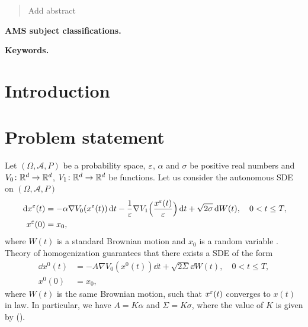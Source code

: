 \documentclass[10pt]{article}
\begin{document}
\maketitle	

\begin{abstract} Add abstract
\end{abstract}

\textbf{AMS subject classifications.} 

\textbf{Keywords.} 

\normalsize
\section{Introduction}


\section{Problem statement}

Let $(\Omega, \mathcal A, P)$ be a probability space, $\varepsilon$, $\alpha$ and $\sigma$ be positive real numbers and $V_0 \colon \mathbb{R}^d \to \mathbb{R}^d$, $V_1 \colon \mathbb{R}^d \to \mathbb{R}^d$ be  functions. Let us consider the autonomous SDE on $(\Omega, \mathcal A, P)$
\begin{equation}\label{eq:SDE_MS}
\begin{aligned}
	\,\mathrm{d} x^\varepsilon(t) &= -\alpha \nabla V_0(x^\varepsilon(t)) \,\mathrm{d} t - \frac{1}{\varepsilon}\nabla V_1\Big(\frac{x^\varepsilon(t)}{\varepsilon}\Big) \,\mathrm{d} t + \sqrt{2\sigma} \,\mathrm{d} W(t), \quad 0 < t \leq T, \\
	x^\varepsilon(0) &= x_0,
\end{aligned}
\end{equation}
where $W(t)$ is a standard Brownian motion and $x_0$ is a random variable . Theory of homogenization guarantees that there exists a SDE of the form
\begin{equation}\label{eq:SDE_HOM}
\begin{aligned}
	\dd x^0(t) &= -A \nabla V_0(x^0(t)) \dd t + \sqrt{2\Sigma} \dd W(t), \quad 0 < t \leq T, \\
	x^0(0) &= x_0,
\end{aligned}
\end{equation}
where $W(t)$ is the same Brownian motion, such that $x^\varepsilon(t)$ converges to $x(t)$ in law. In particular, we have $A = K\alpha$ and $\Sigma = K\sigma$, where the value of $K$ is given by ().
\end{document}
